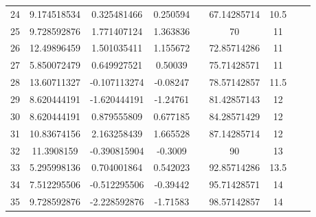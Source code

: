 \begin{center}
{\begin{longtable}{ccccccccc}
24 & 9.174518534 & 0.325481466 & 0.250594 & & 67.14285714 & 10.5 & & \\
25 & 9.728592876 & 1.771407124 & 1.363836 & & 70 & 11 & & \\
26 & 12.49896459 & 1.501035411 & 1.155672 & & 72.85714286 & 11 & & \\
27 & 5.850072479 & 0.649927521 & 0.50039 & & 75.71428571 & 11 & & \\
28 & 13.60711327 & -0.107113274 & -0.08247 & & 78.57142857 & 11.5 & & \\
29 & 8.620444191 & -1.620444191 & -1.24761 & & 81.42857143 & 12 & & \\
30 & 8.620444191 & 0.879555809 & 0.677185 & & 84.28571429 & 12 & & \\
31 & 10.83674156 & 2.163258439 & 1.665528 & & 87.14285714 & 12 & & \\
32 & 11.3908159 & -0.390815904 & -0.3009 & & 90 & 13 & & \\
33 & 5.295998136 & 0.704001864 & 0.542023 & & 92.85714286 & 13.5 & & \\
34 & 7.512295506 & -0.512295506 & -0.39442 & & 95.71428571 & 14 & & \\
35 & 9.728592876 & -2.228592876 & -1.71583 & & 98.57142857 & 14 & & \\
\end{longtable}
}
\end{center}